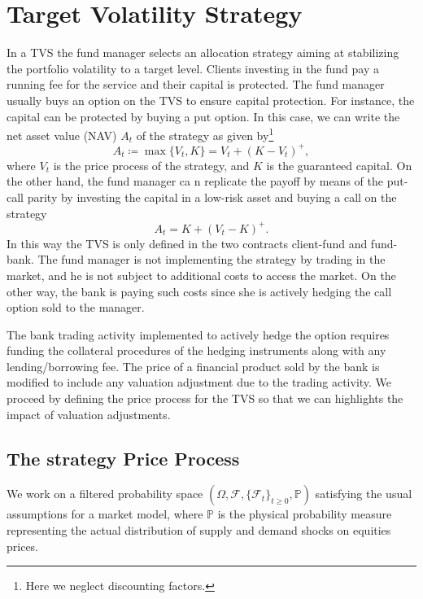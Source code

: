 \documentclass[11pt]{article}
\begin{document}
\section{Target Volatility Strategy}\label{sec:TVS}
In a TVS the fund manager selects an allocation strategy aiming at stabilizing the portfolio volatility to a target level. Clients investing in the fund pay a running fee for the service and their capital is protected. The fund manager usually buys an option on the TVS to ensure capital protection. For instance, the capital can be protected by buying a put option. In this case, we can write the net asset value (NAV) $A_t$ of the strategy as given by\footnote{Here we neglect discounting factors.}
\begin{equation}
    A_t \coloneqq \max\{V_t,K\} = V_t + (K-V_t)^+,
\end{equation}
where $V_t$ is the price process of the strategy, and $K$ is the guaranteed capital. On the other hand, the fund manager ca n replicate the payoff by means of the put-call parity by investing the capital in a low-risk asset and buying a call on the strategy
\begin{equation}
    A_t = K + (V_t-K)^+.
\end{equation}
In this way the TVS is only defined in the two contracts client-fund and fund-bank. The fund manager is not implementing the strategy by trading in the market, and he is not subject to additional costs to access the market. On the other way, the bank is paying such costs since she is actively hedging the call option sold to the manager. 

The bank trading activity implemented to actively hedge the option requires funding the collateral procedures of the hedging instruments along with any lending/borrowing fee. The price of a financial product sold by the bank is modified to include any valuation adjustment due to the trading activity. We proceed by defining the price process for the TVS so that we can highlights the impact of valuation adjustments.
\subsection{The strategy Price Process}
We work on a filtered probability space $\left(\Omega, \mathcal{F}, \{\mathcal{F}_t\}_{t\geq0}, \mathbb{P}  \right)$ satisfying the usual assumptions for a market model, where $\mathbb{P}$ is the physical probability measure representing the actual distribution of supply and demand shocks on equities prices. 
\end{document}
